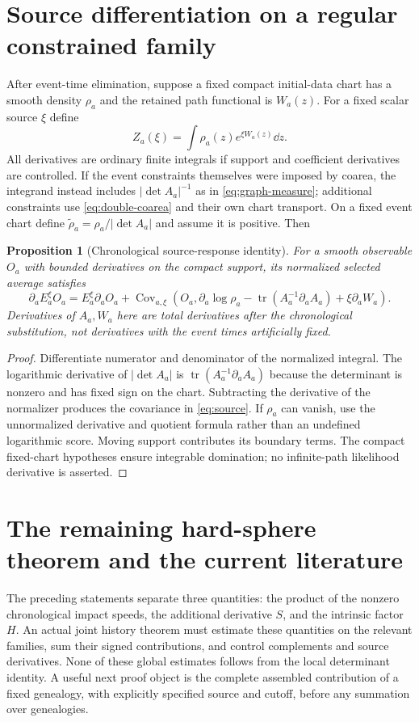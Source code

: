 \documentclass[11pt,reqno]{amsart}
\numberwithin{equation}{section}
\newtheorem{proposition}[theorem]{Proposition}
\theoremstyle{remark}\newtheorem{remark}[theorem]{Remark}
\begin{document}
\section{Source differentiation on a regular constrained family}
After event-time elimination, suppose a fixed compact initial-data chart has a smooth density $\rho_a$ and the retained path functional is $W_a(z)$. For a fixed scalar source $\xi$ define
\[
 Z_a(\xi)=\int \rho_a(z)e^{\xi W_a(z)}\dd z.
\]
All derivatives are ordinary finite integrals if support and coefficient derivatives are controlled. If the event constraints themselves were imposed by coarea, the integrand instead includes $|\det A_a|^{-1}$ as in \eqref{eq:graph-measure}; additional constraints use \eqref{eq:double-coarea} and their own chart transport. On a fixed event chart define $\widetilde\rho_a=\rho_a/|\det A_a|$ and assume it is positive. Then
\begin{proposition}[Chronological source-response identity]\label{prop:source}
For a smooth observable $O_a$ with bounded derivatives on the compact support, its normalized selected average satisfies
\begin{equation}\label{eq:source}
 \partial_a E_a^\xi O_a
 =E_a^\xi\partial_a O_a+
 \operatorname{Cov}_{a,\xi}\left(O_a,
 \partial_a\log\rho_a-\operatorname{tr}(A_a^{-1}\partial_a A_a)+\xi\partial_aW_a\right).
\end{equation}
Derivatives of $A_a,W_a$ here are total derivatives after the chronological substitution, not derivatives with the event times artificially fixed.
\end{proposition}
\begin{proof}
Differentiate numerator and denominator of the normalized integral. The logarithmic derivative of $|\det A_a|$ is $\operatorname{tr}(A_a^{-1}\partial_a A_a)$ because the determinant is nonzero and has fixed sign on the chart. Subtracting the derivative of the normalizer produces the covariance in \eqref{eq:source}. If $\rho_a$ can vanish, use the unnormalized derivative and quotient formula rather than an undefined logarithmic score. Moving support contributes its boundary terms. The compact fixed-chart hypotheses ensure integrable domination; no infinite-path likelihood derivative is asserted.
\end{proof}

\section{The remaining hard-sphere theorem and the current literature}
The preceding statements separate three quantities: the product of the nonzero chronological impact speeds, the additional derivative $S$, and the intrinsic factor $H$. An actual joint history theorem must estimate these quantities on the relevant families, sum their signed contributions, and control complements and source derivatives. None of these global estimates follows from the local determinant identity. A useful next proof object is the complete assembled contribution of a fixed genealogy, with explicitly specified source and cutoff, before any summation over genealogies.
\end{document}
